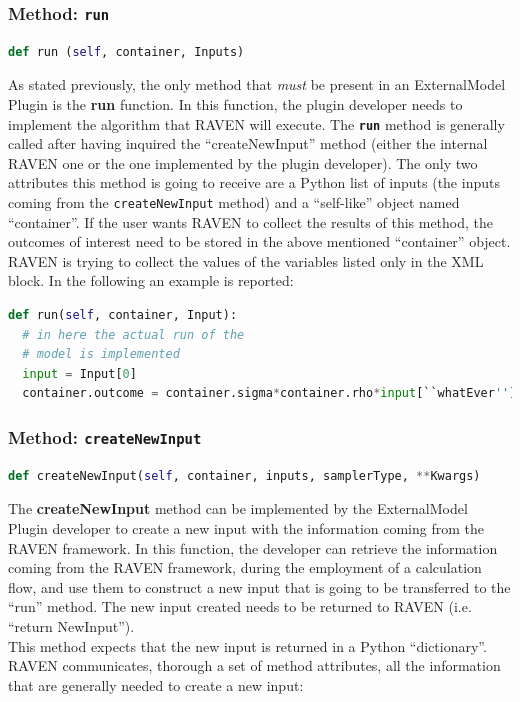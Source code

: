 \subsubsection{Method: \texttt{run}}
\label{subsubsec:runExternalModelPlugin}
\begin{lstlisting}[language=python]
def run (self, container, Inputs)
\end{lstlisting}
As stated previously, the only method that \emph{must} be present in an
ExternalModel Plugin is the \textbf{run} function.
%
In this function, the plugin developer needs to implement the algorithm that RAVEN will
execute.
%
The \texttt{\textbf{run}} method is generally called after having inquired the
``createNewInput'' method (either the internal RAVEN one or the one implemented by
the plugin developer).
%
The only two attributes this method is going to receive are a Python list of inputs
(the inputs coming from the \texttt{createNewInput} method) and a ``self-like'' object
named ``container''.
%
If the user wants RAVEN to collect the results of this method, the outcomes of
interest need to be stored in the above mentioned ``container'' object.
%
\nb RAVEN is trying to collect the values of the variables listed only in the
 XML block.
%
In the following an example is reported:
\begin{lstlisting}[language=python]
def run(self, container, Input):
  # in here the actual run of the
  # model is implemented
  input = Input[0]
  container.outcome = container.sigma*container.rho*input[``whatEver'']
\end{lstlisting}

\subsubsection{Method: \texttt{createNewInput}}
\label{subsubsec:createNewInputExternalModelPlugin}
\begin{lstlisting}[language=python]
def createNewInput(self, container, inputs, samplerType, **Kwargs)
\end{lstlisting}

The \textbf{createNewInput} method can be implemented by the ExternalModel Plugin
developer to create a new input with the information coming from the RAVEN framework.
%
In this function, the developer can retrieve the information coming from the RAVEN
framework, during the employment of a calculation flow, and use them to
construct a new input that is going to be transferred to the ``run'' method.
%
The new input created needs to be returned to RAVEN (i.e. ``return NewInput'').
\\This method expects that the new input is returned in a Python ``dictionary''.
%
RAVEN communicates, thorough a set of method attributes, all the information
that are generally needed to create a new input:

